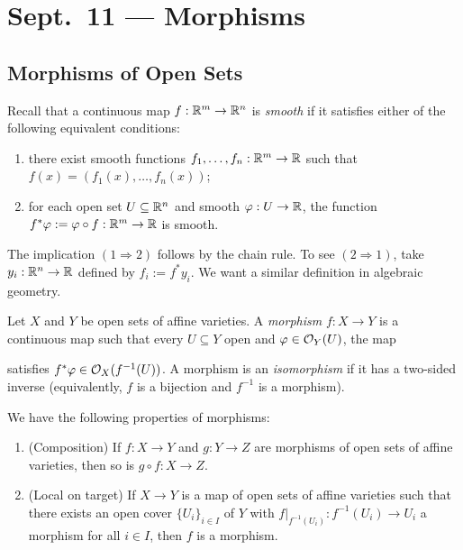 \chapter{Sept.~11 --- Morphisms}

\section{Morphisms of Open Sets}

\begin{remark}
  Recall that a continuous
  map $f : \mathbb{R}^m \to \mathbb{R}^n$ is \emph{smooth} if
  it satisfies either of the following equivalent conditions:
  \begin{enumerate}
    \item there exist smooth functions
      $f_1, \dots, f_n : \mathbb{R}^m \to \mathbb{R}$ such
      that $f(x) = (f_1(x), \dots, f_n(x))$;
    \item for each
      open set $U \subseteq \mathbb{R}^n$ and
      smooth $\varphi : U \to \mathbb{R}$,
      the function $f^* \varphi := \varphi \circ f : \mathbb{R}^m \to \mathbb{R}$
      is smooth.
  \end{enumerate}
  The implication $(1 \Rightarrow 2)$ follows
  by the chain rule. To see $(2 \Rightarrow 1)$,
  take $y_i : \mathbb{R}^n \to \mathbb{R}$
  defined by $f_i := f^* y_i$.
  We want a similar definition
  in algebraic geometry.
\end{remark}

\begin{definition}
  Let $X$ and $Y$ be open sets of affine
  varieties. A \emph{morphism}
  $f : X \to Y$ is a continuous map
  such that every $U \subseteq Y$ open
  and $\varphi \in \mathcal{O}_Y(U)$, the map
  \begin{center}
  \end{center}
  satisfies $f^* \varphi \in \mathcal{O}_X(f^{-1}(U))$.
  A morphism is an \emph{isomorphism}
  if it has a two-sided inverse (equivalently,
  $f$ is a bijection and $f^{-1}$
  is a morphism).
\end{definition}

\begin{remark}
  We have the following properties of
  morphisms:
  \begin{enumerate}
    \item (Composition) If $f : X \to Y$
      and $g : Y \to Z$ are morphisms of
      open sets of affine varieties, then
      so is $g \circ f : X \to Z$.
    \item (Local on target) If $X \to Y$
      is a map of open sets of affine
      varieties such that there exists an
      open cover $\{U_i\}_{i \in I}$ of
      $Y$ with $f|_{f^{-1}(U_i)} : f^{-1}(U_i) \to U_i$
      a morphism for all $i \in I$, then
      $f$ is a morphism.
  \end{enumerate}
\end{remark}

